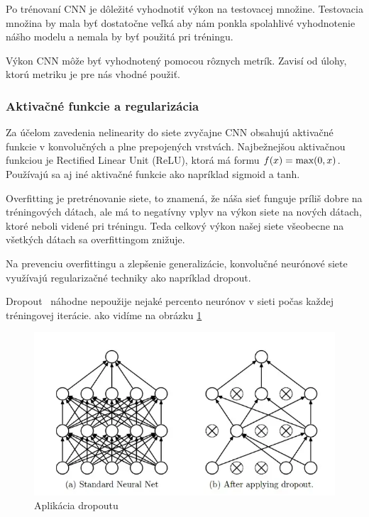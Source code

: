 Po trénovaní CNN je dôležité vyhodnotiť výkon na testovacej množine. Testovacia množina by mala byť dostatočne veľká aby nám ponkla spolahlivé vyhodnotenie nášho modelu a nemala by byť použitá pri tréningu. 

Výkon CNN môže byť vyhodnotený pomocou rôznych metrík. Zavisí od úlohy, ktorú metriku je pre nás vhodné použiť.


\subsubsection{Aktivačné funkcie a regularizácia}

Za účelom zavedenia nelinearity do siete zvyčajne CNN obsahujú aktivačné funkcie v konvolučných a plne prepojených vrstvách. Najbežnejšou aktivačnou funkciou je Rectified Linear Unit (ReLU), ktorá má formu $f(x) = \textnormal{max}(0, x)$. Používajú sa aj iné aktivačné funkcie ako napríklad sigmoid a tanh. 

Overfitting je pretrénovanie siete, to znamená, že náša sieť funguje príliš dobre na tréningových dátach, ale má to negatívny vplyv na výkon siete na nových dátach, ktoré neboli videné pri tréningu. Teda celkový výkon našej siete všeobecne na všetkých dátach sa overfittingom znižuje.

Na prevenciu overfittingu a zlepšenie generalizácie, konvolučné neurónové siete využívajú regularizačné techniky ako napríklad dropout. 

Dropout~\cite{dropout} náhodne nepoužije nejaké percento neurónov v sieti počas každej tréningovej iterácie. ako vidíme na obrázku \ref{fig:image303}

\begin{figure}[H]
\includegraphics[width=\textwidth]{images/dropout.png}
\centering
\caption{Aplikácia dropoutu}
\label{fig:image303}
\end{figure}


